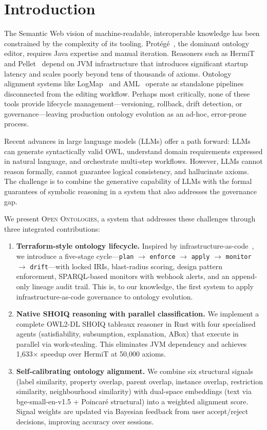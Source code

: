 \documentclass[runningheads]{llncs}
\begin{document}
\section{Introduction}
\label{sec:intro}

The Semantic Web vision of machine-readable, interoperable knowledge has been constrained by the complexity of its tooling. Prot\'eg\'e~\cite{protege}, the dominant ontology editor, requires Java expertise and manual iteration. Reasoners such as HermiT~\cite{hermit} and Pellet~\cite{pellet} depend on JVM infrastructure that introduces significant startup latency and scales poorly beyond tens of thousands of axioms. Ontology alignment systems like LogMap~\cite{logmap} and AML~\cite{aml} operate as standalone pipelines disconnected from the editing workflow. Perhaps most critically, none of these tools provide lifecycle management—versioning, rollback, drift detection, or governance—leaving production ontology evolution as an ad-hoc, error-prone process.

Recent advances in large language models (LLMs) offer a path forward: LLMs can generate syntactically valid OWL, understand domain requirements expressed in natural language, and orchestrate multi-step workflows. However, LLMs cannot reason formally, cannot guarantee logical consistency, and hallucinate axioms. The challenge is to combine the generative capability of LLMs with the formal guarantees of symbolic reasoning in a system that also addresses the governance gap.

We present \textsc{Open Ontologies}, a system that addresses these challenges through three integrated contributions:

\begin{enumerate}
    \item \textbf{Terraform-style ontology lifecycle.} Inspired by infrastructure-as-code~\cite{terraform}, we introduce a five-stage cycle—\texttt{plan} $\to$ \texttt{enforce} $\to$ \texttt{apply} $\to$ \texttt{monitor} $\to$ \texttt{drift}—with locked IRIs, blast-radius scoring, design pattern enforcement, SPARQL-based monitors with webhook alerts, and an append-only lineage audit trail. This is, to our knowledge, the first system to apply infrastructure-as-code governance to ontology evolution.

    \item \textbf{Native SHOIQ reasoning with parallel classification.} We implement a complete OWL2-DL SHOIQ tableaux reasoner in Rust with four specialised agents (satisfiability, subsumption, explanation, ABox) that execute in parallel via work-stealing. This eliminates JVM dependency and achieves 1{,}633$\times$ speedup over HermiT at 50{,}000 axioms.

    \item \textbf{Self-calibrating ontology alignment.} We combine six structural signals (label similarity, property overlap, parent overlap, instance overlap, restriction similarity, neighbourhood similarity) with dual-space embeddings (text via bge-small-en-v1.5 + Poincar\'e structural) into a weighted alignment score. Signal weights are updated via Bayesian feedback from user accept/reject decisions, improving accuracy over sessions.
\end{enumerate}
\end{document}
